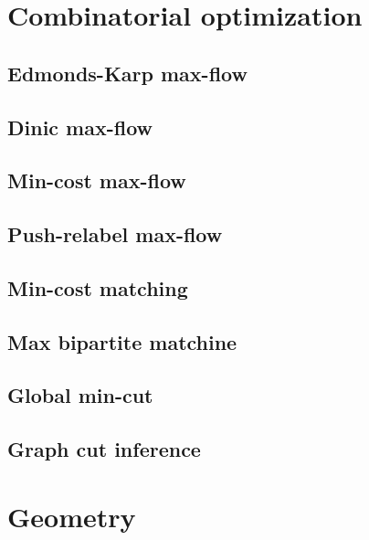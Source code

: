 \section{Combinatorial optimization}
\subsection{Edmonds-Karp max-flow}
\raggedbottom
\hrulefill
\subsection{Dinic max-flow}
\raggedbottom
\hrulefill
\subsection{Min-cost max-flow}
\raggedbottom
\hrulefill
\subsection{Push-relabel max-flow}
\raggedbottom
\hrulefill
\subsection{Min-cost matching}
\raggedbottom
\hrulefill
\subsection{Max bipartite matchine}
\raggedbottom
\hrulefill
\subsection{Global min-cut}
\raggedbottom
\hrulefill
\subsection{Graph cut inference}
\raggedbottom
\hrulefill

\section{Geometry}
